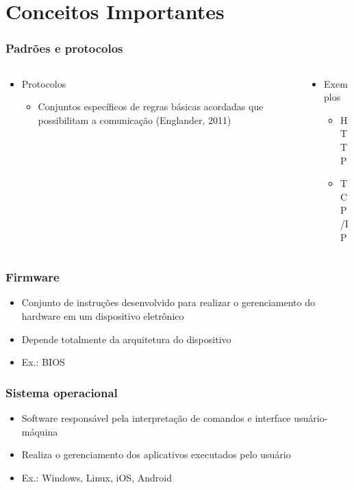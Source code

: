 \documentclass[aspectratio=169,
				xcolor=table]{beamer}
\begin{document}
	\section{Conceitos Importantes}
	\begin{frame}
		\frametitle{Padrões e protocolos}
		\begin{columns}
			\begin{column}{0.55\textwidth}
				\begin{itemize}
					\item Protocolos
					\begin{itemize}
						\item Conjuntos específicos de regras básicas acordadas que possibilitam a comunicação (Englander, 2011)

					\end{itemize}
				\end{itemize}
			\end{column}
			\begin{column}{0.45\textwidth}
				\begin{itemize}
					\item Exemplos
					\begin{itemize}
						\item HTTP
						\item TCP/IP
					\end{itemize}
				\end{itemize}
			\end{column}
		\end{columns}
	\end{frame}
	
	\begin{frame}
		\frametitle{Firmware}
		\begin{itemize}
			\item Conjunto de instruções desenvolvido para realizar o gerenciamento do hardware em um dispositivo eletrônico
			\vspace{1em}
			\item Depende totalmente da arquitetura do dispositivo
			\vspace{1em}
			\item Ex.: BIOS
		\end{itemize}
	\end{frame}
	
	\begin{frame}
		\frametitle{Sistema operacional}
		\begin{itemize}
			\item Software responsável pela interpretação de comandos e interface usuário-máquina
			\vspace{1em}
			\item Realiza o gerenciamento dos aplicativos executados pelo usuário
			\vspace{1em}
			\item Ex.: Windows, Linux, iOS, Android
		\end{itemize}
	\end{frame}
\end{document}
